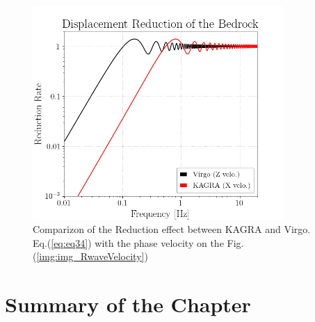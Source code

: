 \documentclass[a4paper,12pt]{book}
\begin{document}
\subsubsection{}


\begin{figure}[H]
  \begin{center}
    \includegraphics[width=9.5cm]{./img_CDMR.png}
  \end{center}
  \caption{Comparizon of the Reduction effect between KAGRA and Virgo. Eq.(\ref{eq:eq34}) with the phase velocity on the Fig.(\ref{img:img_RwaveVelocity})}
  \label{img:img_dmrr}
\end{figure}


\section{Summary of the Chapter}

\appendix


\end{document}
